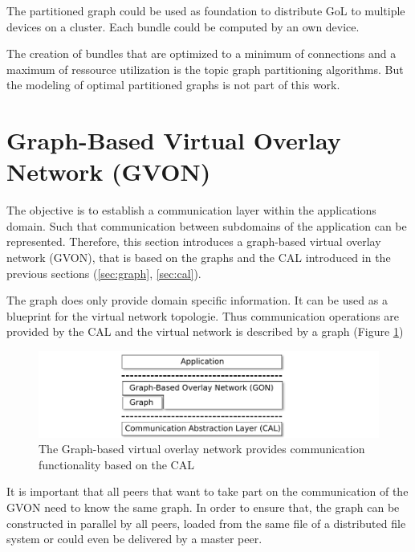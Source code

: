 The partitioned graph could be used as foundation to distribute GoL to
multiple devices on a cluster. Each bundle could be computed by an own
device. 

The creation of bundles that are optimized to a minimum of connections
and a maximum of ressource utilization is the topic graph partitioning
algorithms. But the modeling of optimal partitioned graphs is not part
of this work.


\section{Graph-Based Virtual Overlay Network (GVON)}
The objective is to establish a communication layer within the
applications domain. Such that communication between subdomains of the
application can be represented. Therefore, this section introduces a
graph-based virtual overlay network (GVON), that is based on the graphs and the
CAL introduced in the previous sections (\ref{sec:graph},
\ref{sec:cal}). 

The graph does only provide domain specific information.  It can be
used as a blueprint for the virtual network topologie.  Thus
communication operations are provided by the CAL and the virtual
network is described by a graph (Figure \ref{fig:gon})

\begin{figure}[H]
  \centering \includegraphics[width=\textwidth]{graphics/30_gon}
  \caption{The Graph-based virtual overlay network provides communication
    functionality based on the CAL}
  \label{fig:gon}
\end{figure}

It is important that all peers that want to take part on the
communication of the GVON need to know the same graph. In order to
ensure that, the graph can be constructed in parallel by all peers,
loaded from the same file of a distributed file system or could even
be delivered by a master peer.

